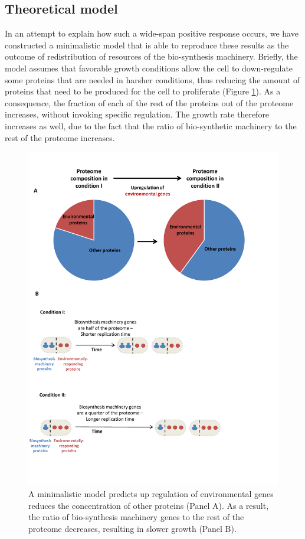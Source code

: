 \documentclass[a4paper,landscape,titlepage,17pt]{extarticle}
\begin{document}
\clearpage        
\subsection*{Theoretical model}
In an attempt to explain how such a wide-span positive response occurs, we have constructed a minimalistic model that is able to reproduce these results as the outcome of redistribution of resources of the bio-synthesis machinery.
Briefly, the model assumes that favorable growth conditions allow the cell to down-regulate some proteins that are needed in harsher conditions, thus reducing the amount of proteins that need to be produced for the cell to proliferate (Figure \ref{fig:model}).
As a consequence, the fraction of each of the rest of the proteins out of the proteome increases, without invoking specific regulation.
The growth rate therefore increases as well, due to the fact that the ratio of bio-synthetic machinery to the rest of the proteome increases.

\clearpage
\begin{landscape}
\begin{figure}[h]
\centering
\includegraphics[scale=0.9]{Figures7-trieste.pdf}
\caption{\linespread{0.5}\selectfont{}
  A minimalistic model predicts up regulation of environmental genes reduces the concentration of other proteins (Panel A).
As a result, the ratio of bio-synthesis machinery genes to the rest of the proteome decreases, resulting in slower growth (Panel B).
}
\label{fig:model}
\end{figure}
\end{landscape}
\clearpage        


\printbibliography
\end{document}
